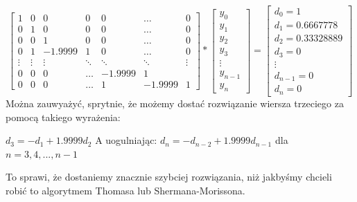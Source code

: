 \documentclass[12pt]{article}
\begin{document}
\[
\begin{bmatrix}
    1 & 0 & 0 & 0 & 0 & \dots & 0\\
    0 & 1 & 0 & 0 & 0 & \dots & 0\\ 
    0 & 0 & 1 & 0 & 0 & \dots & 0\\
    0 & 1 & -1.9999 & 1 & 0 & \dots & 0\\
    \vdots & \vdots & \vdots & \ddots & \ddots & \ddots & \vdots\\
    0 & 0 & 0 & \hdots & -1.9999 & 1 & \\
    0 & 0 & 0 & \hdots & 1 & -1.9999 & 1
\end{bmatrix}
*
\begin{bmatrix}
    y_{0}\\
    y_{1}\\
    y_{2}\\
    y_{3}\\
    \vdots\\
    y_{n-1}\\
    y_{n}
\end{bmatrix}
=
\begin{bmatrix}
    d_{0} = 1\\
    d_{1} = 0.6667778\\
    d_{2} = 0.33328889\\
    d_{3} = 0\\
    \vdots\\
    d_{n-1} = 0\\
    d_{n} = 0
\end{bmatrix}
\]
Można zauwyażyć, sprytnie, że możemy dostać rozwiązanie wiersza trzeciego za pomocą takiego wyrażenia:
\begin{center}
    $d_{3} = -d_{1}+1.9999d_{2}$\newline\newline
    A uogulniając: \newline\newline
    $d_{n} = -d_{n-2}+1.9999d_{n-1}$ dla $n = 3,4,...,n-1$
\end{center}
To sprawi, że dostaniemy znacznie szybciej rozwiązania, niż jakbyśmy chcieli robić to algorytmem Thomasa lub Shermana-Morissona.
\end{document}
